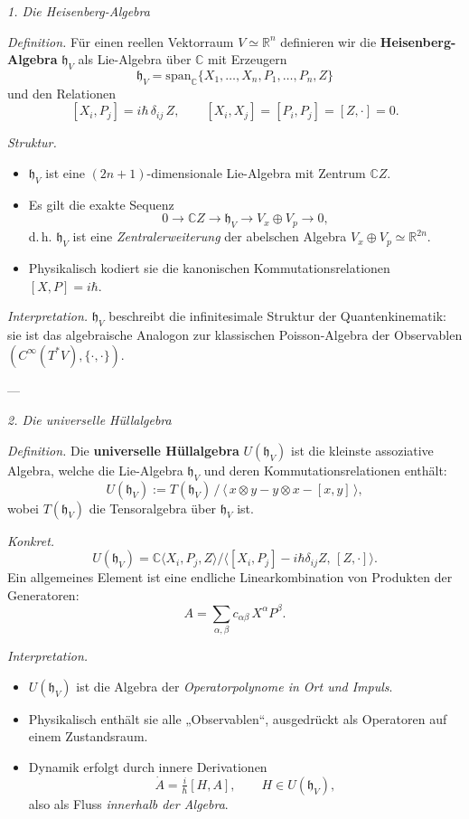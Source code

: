 \documentclass[10pt, letterpaper]{article}
\newcommand{\R}{\mathbb{R}}
\newcommand{\C}{\mathbb{C}}
\begin{document}
\emph{1. Die Heisenberg-Algebra}

\emph{Definition.}
Für einen reellen Vektorraum \(V\simeq\R^n\) definieren wir die
\textbf{Heisenberg-Algebra} \(\mathfrak{h}_V\) als Lie-Algebra über \(\C\)
mit Erzeugern
\[
\mathfrak{h}_V = \mathrm{span}_\C\{X_1,\ldots,X_n, P_1,\ldots,P_n, Z\}
\]
und den Relationen
\[
[X_i,P_j] = i\hbar\,\delta_{ij}\,Z, 
\qquad [X_i,X_j]=[P_i,P_j]=[Z,\cdot]=0.
\]

\emph{Struktur.}
\begin{itemize}
  \item \(\mathfrak{h}_V\) ist eine $(2n+1)$-dimensionale Lie-Algebra mit Zentrum \(\C Z\).
  \item Es gilt die exakte Sequenz
  \[
  0 \longrightarrow \C Z \longrightarrow \mathfrak{h}_V 
  \longrightarrow V_x \oplus V_p \longrightarrow 0,
  \]
  d.\,h. \(\mathfrak{h}_V\) ist eine \emph{Zentralerweiterung}
  der abelschen Algebra \(V_x\oplus V_p\simeq\R^{2n}\).
  \item Physikalisch kodiert sie die kanonischen Kommutationsrelationen
        \([X,P]=i\hbar\).
\end{itemize}

\emph{Interpretation.}
\(\mathfrak{h}_V\) beschreibt die infinitesimale Struktur
der Quantenkinematik: sie ist das algebraische Analogon
zur klassischen Poisson-Algebra der Observablen
\((C^\infty(T^\ast V),\{\cdot,\cdot\})\).

---

\emph{2. Die universelle Hüllalgebra}

\emph{Definition.}
Die \textbf{universelle Hüllalgebra} \(U(\mathfrak{h}_V)\)
ist die kleinste assoziative Algebra, welche die Lie-Algebra
\(\mathfrak{h}_V\) und deren Kommutationsrelationen enthält:
\[
U(\mathfrak{h}_V)
:= T(\mathfrak{h}_V)\, /\, 
\langle\, x\otimes y - y\otimes x - [x,y]\,\rangle,
\]
wobei \(T(\mathfrak{h}_V)\) die Tensoralgebra über \(\mathfrak{h}_V\) ist.

\emph{Konkret.}
\[
U(\mathfrak{h}_V)
= \C\langle X_i,P_j,Z\rangle
\big/\langle [X_i,P_j]-i\hbar\delta_{ij}Z,\,[Z,\cdot]\rangle.
\]
Ein allgemeines Element ist eine endliche Linearkombination
von Produkten der Generatoren:
\[
A=\sum_{\alpha,\beta} c_{\alpha\beta}\, X^\alpha P^\beta.
\]

\emph{Interpretation.}
\begin{itemize}
  \item \(U(\mathfrak{h}_V)\) ist die Algebra der \emph{Operatorpolynome in Ort und Impuls}.
  \item Physikalisch enthält sie alle „Observablen“, ausgedrückt als Operatoren auf einem Zustandsraum.
  \item Dynamik erfolgt durch innere Derivationen
        \[
        \dot{A} = \tfrac{i}{\hbar}[H,A],\qquad H\in U(\mathfrak{h}_V),
        \]
        also als Fluss \emph{innerhalb der Algebra}.
\end{itemize}
\end{document}
